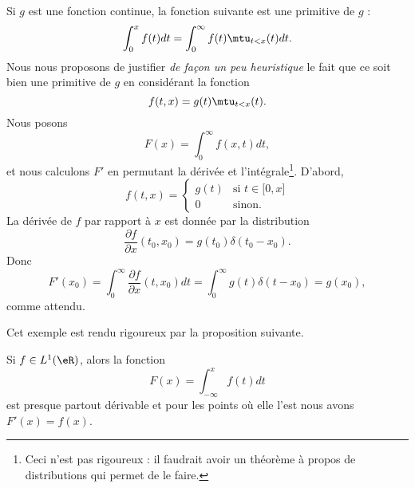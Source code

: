 \begin{example} \label{ExfYXeQg}
    Si \( g\) est une fonction continue, la fonction suivante est une primitive de \( g\) :
    \begin{equation}
        \int_0^xf(t)dt=\int_0^{\infty}f(t)\mtu_{t<x}(t)dt.
    \end{equation}
    Nous nous proposons de justifier \emph{de façon un peu heuristique} le fait que ce soit bien une primitive de \( g\) en considérant la fonction
    \begin{equation}
        f(t,x)=g(t)\mtu_{t<x}(t).
    \end{equation}
    Nous posons
    \begin{equation}
        F(x)=\int_0^{\infty}f(x,t)dt,
    \end{equation}
    et nous calculons \( F'\) en permutant la dérivée et l'intégrale\footnote{Ceci n'est pas rigoureux : il faudrait avoir un théorème à propos de distributions qui permet de le faire.}. D'abord,
    \begin{equation}
        f(t,x)=\begin{cases}
            g(t)    &   \text{si } t\in \mathopen[ 0 , x \mathclose]\\
            0    &    \text{sinon.}
        \end{cases}
    \end{equation}
    La dérivée de \( f\) par rapport à \( x\) est donnée par la distribution
    \begin{equation}
        \frac{ \partial f }{ \partial x }(t_0,x_0)=g(t_0)\delta(t_0-x_0).
    \end{equation}
    Donc
    \begin{equation}
        F'(x_0)=\int_0^{\infty}\frac{ \partial f }{ \partial x }(t,x_0)dt=\int_0^{\infty}g(t)\delta(t-x_0)=g(x_0),
    \end{equation}
    comme attendu.
\end{example}

Cet exemple est rendu rigoureux par la proposition suivante.
\begin{proposition} \label{PropJLnPpaw}
    Si \( f\in L^1(\eR)\), alors la fonction
    \begin{equation}
        F(x)=\int_{-\infty}^xf(t)dt
    \end{equation}
    est presque partout dérivable et pour les points où elle l'est nous avons \( F'(x)=f(x)\).
\end{proposition}

